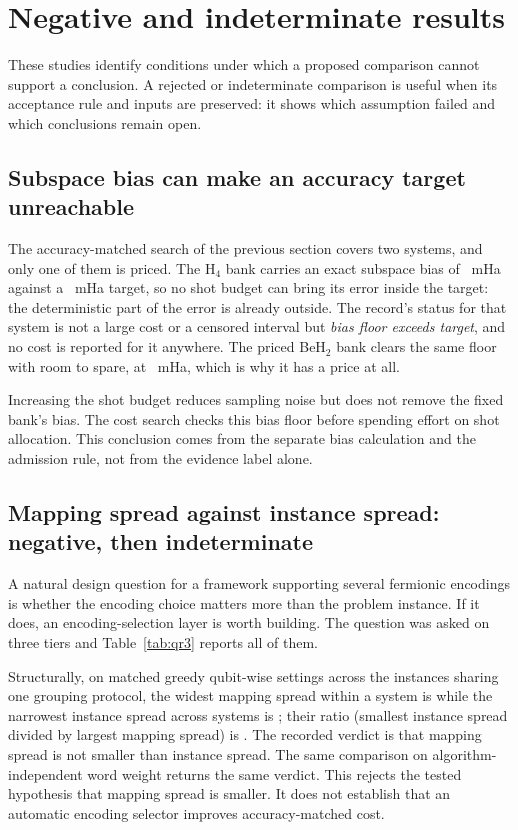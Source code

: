 \documentclass[aps,pra,reprint,superscriptaddress,nofootinbib,floatfix,
  showkeys]{revtex4-2}
\begin{document}
\section{Negative and indeterminate results}
\label{sec:refused}

These studies identify conditions under which a proposed comparison cannot
support a conclusion. A rejected or indeterminate comparison is useful when its
acceptance rule and inputs are preserved: it shows which assumption failed and
which conclusions remain open.

\subsection{Subspace bias can make an accuracy target unreachable}

The accuracy-matched search of the previous section covers two systems, and only
one of them is priced.  The H$_4$ bank carries an exact subspace bias of
\cqcHFourBias{}~mHa against a \cqcTargetMilliHartree{}~mHa target, so no shot
budget can bring its error inside the target: the deterministic part of the
error is already outside.  The record's status for that system is not a large
cost or a censored interval but \emph{bias floor exceeds target}, and no cost is
reported for it anywhere.  The priced BeH$_2$ bank clears the same floor with
room to spare, at \cqcBeHBias{}~mHa, which is why it has a price at all.

Increasing the shot budget reduces sampling noise but does not remove the
fixed bank's bias. The cost search checks this bias floor before spending effort
on shot allocation. This conclusion comes from the separate bias calculation
and the admission rule, not from the evidence label alone.

\subsection{Mapping spread against instance spread: negative, then
indeterminate}

A natural design question for a framework supporting several fermionic
encodings \cite{jordan1928,bravyi2002fermionic,seeley2012bravyikitaev} is
whether the encoding choice matters more than the problem instance.  If it
does, an encoding-selection layer is worth building.  The question was asked on
three tiers and Table~\ref{tab:qr3} reports all of them.

Structurally, on matched greedy qubit-wise settings across the instances sharing
one grouping protocol, the widest mapping spread within a system is
\cqcStructuralMapping{} while the narrowest instance spread across systems is
\cqcStructuralInstance{}; their ratio (smallest instance spread divided by
largest mapping spread) is \cqcStructuralMargin{}. The recorded verdict is that mapping spread is not smaller than instance spread.
The same comparison on algorithm-independent word weight returns the same
verdict.  This rejects the tested hypothesis that mapping spread is smaller. It does
not establish that an automatic encoding selector improves accuracy-matched cost.
\end{document}
